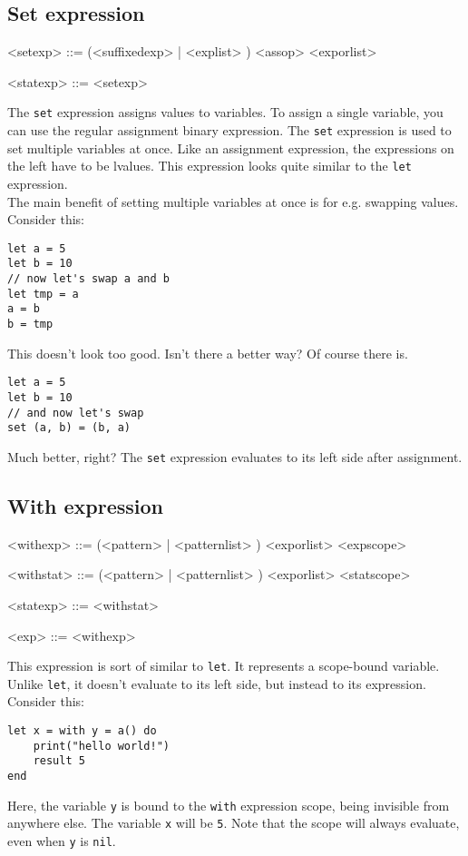 \documentclass{article}
\newenvironment{bnf}
{
\begin{mdframed}
\begin{grammar}
}
{
\end{grammar}
\end{mdframed}
}
\begin{document}
\subsection{Set expression}
\begin{bnf}
<setexp> ::=  (<suffixedexp> | \lit{(} <explist> \lit{)})
<assop> <exporlist>

<statexp> ::= <setexp>
\end{bnf}
The \verb|set| expression assigns values to variables. To assign a single
variable, you can use the regular assignment binary expression. The \verb|set|
expression is used to set multiple variables at once. Like an assignment
expression, the expressions on the left have to be lvalues. This expression
looks quite similar to the \verb|let| expression.\\
The main benefit of setting multiple variables at once is for e.g. swapping
values. Consider this:
\begin{lstlisting}[language=vortex]
let a = 5
let b = 10
// now let's swap a and b
let tmp = a
a = b
b = tmp
\end{lstlisting}
This doesn't look too good. Isn't there a better way? Of course there is.
\begin{lstlisting}[language=vortex]
let a = 5
let b = 10
// and now let's swap
set (a, b) = (b, a)
\end{lstlisting}
Much better, right? The \verb|set| expression evaluates to its left side
after assignment.
\subsection{With expression}
\begin{bnf}
<withexp> ::=  (<pattern> | \lit{(} <patternlist> \lit{)})
    \lit{=} <exporlist> <expscope>

<withstat> ::=  (<pattern> | \lit{(} <patternlist> \lit{)})
    \lit{=} <exporlist> <statscope>

<statexp> ::= <withstat>

<exp> ::= <withexp>
\end{bnf}
This expression is sort of similar to \verb|let|. It represents a scope-bound
variable. Unlike \verb|let|, it doesn't evaluate to its left side, but instead
to its expression. Consider this:
\begin{lstlisting}[language=vortex]
let x = with y = a() do
    print("hello world!")
    result 5
end
\end{lstlisting}
Here, the variable \verb|y| is bound to the \verb|with| expression scope, being
invisible from anywhere else. The variable \verb|x| will be \verb|5|. Note that
the scope will always evaluate, even when \verb|y| is \verb|nil|.
\end{document}

